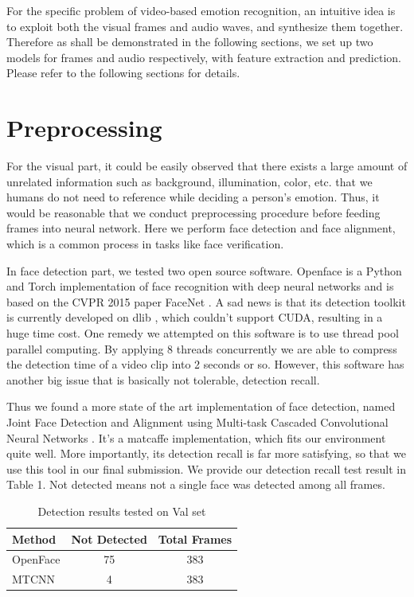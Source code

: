 \documentclass[10pt,twocolumn,letterpaper]{article}
\begin{document}
For the specific problem of video-based emotion recognition, an intuitive idea is to exploit both the visual frames and audio waves, and synthesize them together. Therefore as shall be demonstrated in the following sections, we set up two models for frames and audio respectively, with feature extraction and prediction. Please refer to the following sections for details. 

\section{Preprocessing}

For the visual part, it could be easily observed that there exists a large amount of unrelated information such as background, illumination, color, etc. that we humans do not need to reference while deciding a person's emotion. Thus, it would be reasonable that we conduct preprocessing procedure before feeding frames into neural network. Here we perform face detection and face alignment, which is a common process in tasks like face verification.

In face detection part, we tested two open source software. Openface \cite{amos2016openface} is a Python and Torch implementation of face recognition with deep neural networks and is based on the CVPR 2015 paper FaceNet \cite{schroff2015facenet}. A sad news is that its detection toolkit is currently developed on dlib \cite{king2009dlib}, which couldn't support CUDA, resulting in a huge time cost. One remedy we attempted on this software is to use thread pool parallel computing. By applying 8 threads concurrently we are able to compress the detection time of a video clip into 2 seconds or so. However, this software has another big issue that is basically not tolerable, detection recall.

Thus we found a more state of the art implementation of face detection, named Joint Face Detection and Alignment using Multi-task Cascaded Convolutional Neural Networks \cite{7553523}. It's a matcaffe implementation, which fits our environment quite well. More importantly, its detection recall is far more satisfying, so that we use this tool in our final submission. We provide our detection recall test result in Table 1. Not detected means not a single face was detected among all frames. 

\begin{table}[htpb]
	\begin{center}
		\begin{tabular}{|l|c|c|}
			\hline
			Method & Not Detected & Total Frames\\
			\hline\hline
			OpenFace & 75 & 383\\
			\hline
			MTCNN & 4 & 383\\
			\hline
		\end{tabular}
	\end{center}
	\caption{Detection results tested on Val set}
\end{table}
\end{document}
